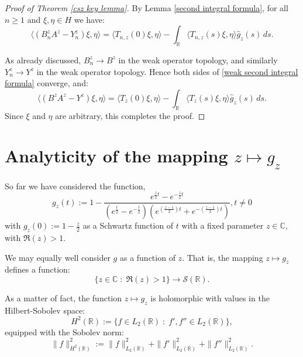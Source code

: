 \begin{proof}[Proof of Theorem \ref{csz key lemma}]
        By Lemma \ref{second integral formula}, for all $n\geq 1$ and $\xi,\eta \in H$ we have:
        \begin{equation}\label{weak second integral formula}
            \langle (B_n^zA^z - Y_n^z)\xi,\eta\rangle =\langle T_{n,z}(0)\xi,\eta\rangle-\int_{\mathbb{R}} \langle T_{n,z}(s)\xi,\eta\rangle \widehat{g}_z(s)\,ds.
        \end{equation}
        
        As already discussed, $B_n^z\to B^z$ in the weak operator topology, and similarly $Y_n^z\to Y^z$ in the weak operator topology. Hence
        both sides of \eqref{weak second integral formula} converge, and:
        \begin{equation*}
            \langle (B^zA^z-Y^z)\xi,\eta\rangle =\langle T_z(0)\xi,\eta\rangle-\int_{\mathbb{R}} \langle T_z(s)\xi,\eta\rangle \widehat{g}_z(s)\,ds.
        \end{equation*}
        Since $\xi$ and $\eta$ are arbitrary, this completes the proof.
    \end{proof}

\section{Analyticity of the mapping $z \mapsto g_z$}
    So far we have considered the function,
    \begin{equation*}
        g_z(t) := 1-\frac{e^{\frac{z}{2}t}-e^{-\frac{z}{2}t}}{(e^{\frac{t}{2}}-e^{-\frac{t}{2}})(e^{\left(\frac{z-1}{2}\right)t}+e^{-\left(\frac{z-1}{2}\right)t})}, t\neq 0
    \end{equation*}
    with $g_z(0) := 1-\frac{z}{2}$ as a Schwartz function of $t$ with a fixed parameter $z \in \mathbb{C}$, with $\Re(z) > 1$. 
    
    We may equally well consider $g$ as a function of $z$. That is, the mapping $z \mapsto g_z$
    defines a function:
    \begin{equation*}
        \{z \in \mathbb{C}\;:\; \Re(z)>1\} \to \mathcal{S}(\mathbb{R}).
    \end{equation*}
    
    As a matter of fact, the function $z\mapsto g_z$ is holomorphic with values in the Hilbert-Sobolev space:
    \begin{equation*}
        H^2(\mathbb{R}) := \{f \in L_2(\mathbb{R})\;:\; f',f'' \in L_2(\mathbb{R})\},
    \end{equation*}
    equipped with the Sobolev norm:
    \begin{equation*}
        \|f\|_{H^2(\mathbb{R})}^2 := \|f\|_{L_2(\mathbb{R})}^2 + \|f'\|_{L_2(\mathbb{R})}^2 + \|f''\|_{L_2(\mathbb{R})}^2.
    \end{equation*}


